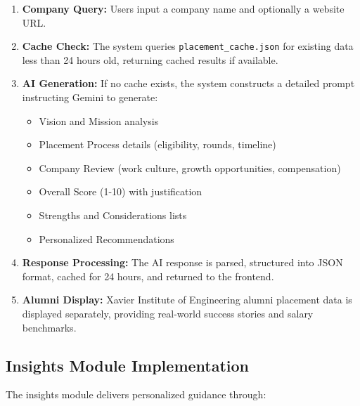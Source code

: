 \documentclass[12pt]{article}
\begin{document}
\begin{enumerate}
    \item \textbf{Company Query:} Users input a company name and optionally a website URL.
    
    \item \textbf{Cache Check:} The system queries \texttt{placement\_cache.json} for existing data less than 24 hours old, returning cached results if available.
    
    \item \textbf{AI Generation:} If no cache exists, the system constructs a detailed prompt instructing Gemini to generate:
    \begin{itemize}
        \item Vision and Mission analysis
        \item Placement Process details (eligibility, rounds, timeline)
        \item Company Review (work culture, growth opportunities, compensation)
        \item Overall Score (1-10) with justification
        \item Strengths and Considerations lists
        \item Personalized Recommendations
    \end{itemize}
    
    \item \textbf{Response Processing:} The AI response is parsed, structured into JSON format, cached for 24 hours, and returned to the frontend.
    
    \item \textbf{Alumni Display:} Xavier Institute of Engineering alumni placement data is displayed separately, providing real-world success stories and salary benchmarks.
\end{enumerate}

\subsection{Insights Module Implementation}
The insights module delivers personalized guidance through:
\end{document}
